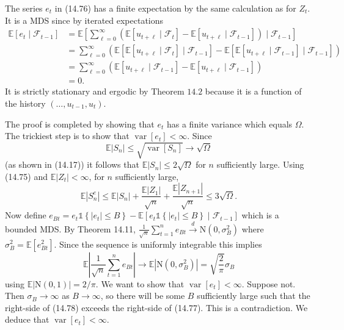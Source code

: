 \documentclass[10pt]{article}
\begin{document}
The series $e_{t}$ in (14.76) has a finite expectation by the same calculation as for $Z_{t}$. It is a MDS since by iterated expectations
$$
\begin{aligned}
\mathbb{E}\left[e_{t} \mid \mathscr{F}_{t-1}\right] &=\mathbb{E}\left[\sum_{\ell=0}^{\infty}\left(\mathbb{E}\left[u_{t+\ell} \mid \mathscr{F}_{t}\right]-\mathbb{E}\left[u_{t+\ell} \mid \mathscr{F}_{t-1}\right]\right) \mid \mathscr{F}_{t-1}\right] \\
&=\sum_{\ell=0}^{\infty}\left(\mathbb{E}\left[\mathbb{E}\left[u_{t+\ell} \mid \mathscr{F}_{t}\right] \mid \mathscr{F}_{t-1}\right]-\mathbb{E}\left[\mathbb{E}\left[u_{t+\ell} \mid \mathscr{F}_{t-1}\right] \mid \mathscr{F}_{t-1}\right]\right) \\
&=\sum_{\ell=0}^{\infty}\left(\mathbb{E}\left[u_{t+\ell} \mid \mathscr{F}_{t-1}\right]-\mathbb{E}\left[u_{t+\ell} \mid \mathscr{F}_{t-1}\right]\right) \\
&=0 .
\end{aligned}
$$
It is strictly stationary and ergodic by Theorem $14.2$ because it is a function of the history $\left(\ldots, u_{t-1}, u_{t}\right)$.

The proof is completed by showing that $e_{t}$ has a finite variance which equals $\Omega$. The trickiest step is to show that $\operatorname{var}\left[e_{t}\right]<\infty$. Since
$$
\mathbb{E}\left|S_{n}\right| \leq \sqrt{\operatorname{var}\left[S_{n}\right]} \rightarrow \sqrt{\Omega}
$$
(as shown in (14.17)) it follows that $\mathbb{E}\left|S_{n}\right| \leq 2 \sqrt{\Omega}$ for $n$ sufficiently large. Using (14.75) and $\mathbb{E}\left|Z_{t}\right|<\infty$, for $n$ sufficiently large,
$$
\mathbb{E}\left|S_{n}^{e}\right| \leq \mathbb{E}\left|S_{n}\right|+\frac{\mathbb{E}\left|Z_{1}\right|}{\sqrt{n}}+\frac{\mathbb{E}\left|Z_{n+1}\right|}{\sqrt{n}} \leq 3 \sqrt{\Omega} .
$$
Now define $e_{B t}=e_{t} \mathbb{1}\left\{\left|e_{t}\right| \leq B\right\}-\mathbb{E}\left[e_{t} \mathbb{1}\left\{\left|e_{t}\right| \leq B\right\} \mid \mathscr{F}_{t-1}\right]$ which is a bounded MDS. By Theorem 14.11, $\frac{1}{\sqrt{n}} \sum_{t=1}^{n} e_{B t} \stackrel{d}{\longrightarrow} \mathrm{N}\left(0, \sigma_{B}^{2}\right)$ where $\sigma_{B}^{2}=\mathbb{E}\left[e_{B t}^{2}\right]$. Since the sequence is uniformly integrable this implies
$$
\mathbb{E}\left|\frac{1}{\sqrt{n}} \sum_{t=1}^{n} e_{B t}\right| \longrightarrow \mathbb{E}\left|\mathrm{N}\left(0, \sigma_{B}^{2}\right)\right|=\sqrt{\frac{2}{\pi}} \sigma_{B}
$$
using $\mathbb{E}|\mathrm{N}(0,1)|=2 / \pi$. We want to show that $\operatorname{var}\left[e_{t}\right]<\infty$. Suppose not. Then $\sigma_{B} \rightarrow \infty$ as $B \rightarrow \infty$, so there will be some $B$ sufficiently large such that the right-side of (14.78) exceeds the right-side of (14.77). This is a contradiction. We deduce that $\operatorname{var}\left[e_{t}\right]<\infty$.
\end{document}
